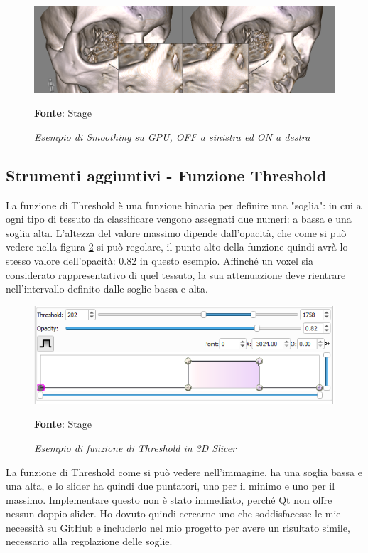 \begin{figure}[h]
    \centering
    \includegraphics[width=1\textwidth]{immagini/svolgimento/smoothing.png}
    \caption{\textit{Esempio di Smoothing su GPU, OFF a sinistra ed ON a destra}}
    \textbf{Fonte}: Stage
    \label{fig: firstvolume}
\end{figure}

\subsection{Strumenti aggiuntivi - Funzione Threshold}
La funzione di Threshold è una funzione binaria per definire una "soglia": in cui a ogni tipo di tessuto da classificare vengono assegnati due numeri: a bassa e una soglia alta. L'altezza del valore massimo dipende dall'opacità, che come si può vedere nella figura \ref{fig: Threshold} si può regolare, il punto alto della funzione quindi avrà lo stesso valore dell'opacità: 0.82 in questo esempio. Affinché un voxel sia considerato rappresentativo di quel tessuto, la sua attenuazione deve rientrare nell'intervallo definito dalle soglie bassa e alta.

\begin{figure}[h]
    \centering
    \includegraphics[width=1\textwidth]{immagini/svolgimento/slicerthreshold.png}
    \caption{\textit{Esempio di funzione di Threshold in 3D Slicer}}
    \textbf{Fonte}: Stage
    \label{fig: Threshold}
\end{figure}

La funzione di Threshold come si può vedere nell'immagine, ha una soglia bassa e una alta, e lo slider ha quindi due puntatori, uno per il minimo e uno per il massimo. Implementare questo non è stato immediato, perché Qt non offre nessun doppio-slider. Ho dovuto quindi cercarne uno che soddisfacesse le mie necessità su GitHub e includerlo nel mio progetto per avere un risultato simile, necessario alla regolazione delle soglie.

